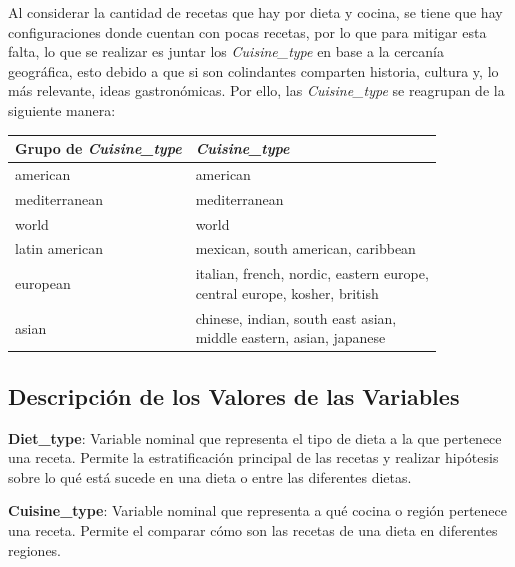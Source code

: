 \documentclass[12pt,a4paper]{article}
\begin{document}
{{            Al considerar la cantidad de recetas que hay por dieta y cocina, se tiene que 
            hay configuraciones donde cuentan con pocas recetas, 
            por lo que para mitigar esta falta, lo que se realizar es juntar 
            los \emph{Cuisine\_type} en base a la cercanía geográfica, esto debido a 
            que si son colindantes comparten historia, cultura y, lo más relevante, ideas 
            gastronómicas. Por ello, las \emph{Cuisine\_type} se reagrupan de la siguiente 
            manera: 

            \begin{center}
                \begin{tabular}{l|l}
                \toprule
                    Grupo de \emph{Cuisine\_type} & \emph{Cuisine\_type} \\
                \midrule
                    american & american \\
                    mediterranean & mediterranean \\
                    world & world \\
                    latin american & mexican, south american, caribbean \\
                    european & \makecell{italian, french, nordic, eastern europe,\\central europe, kosher, british} \\
                    asian & \makecell{chinese, indian, south east asian,\\middle eastern, asian, japanese} \\
                \bottomrule
                \end{tabular}
            \end{center}
        }

        \subsection{Descripción de los Valores de las Variables}
        {
            \begin{itemize}[label=\textbullet]
            {
                \item \textbf{Diet\_type}: Variable nominal que representa el tipo de 
                dieta a la que pertenece una receta. Permite la estratificación principal de  
                las recetas y realizar hipótesis sobre lo qué está sucede en una dieta o entre las diferentes dietas.
                
                \item \textbf{Cuisine\_type}: Variable nominal que representa a qué 
                cocina o región pertenece una 
                receta. Permite el comparar cómo son las recetas 
                de una dieta en diferentes regiones.
                
}
\end{itemize}}}
\end{document}

